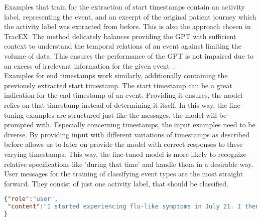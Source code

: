 Examples that train for the extraction of start timestamps contain an activity label, representing the event, and an excerpt of the original patient journey which the activity label was extracted from before. This is also the approach chosen in TracEX. The method delicately balances providing the GPT with sufficient context to understand the temporal relations of an event against limiting the volume of data. This ensures the performance of the GPT is not impaired due to an excess of irrelevant information for the given event~\cite{han_is_2023}.\\
Examples for end timestamps work similarly, additionally containing the previously extracted start timestamp. The start timestamp can be a great indication for the end timestamp of an event. Providing it ensures, the model relies on that timestamp instead of determining it itself.
In this way, the fine-tuning examples are structured just like the messages, the model will be prompted with. Especially concerning timestamps, the input examples need to be diverse. By providing input with different variations of timestamps as described before allows us to later on provide the model with  correct responses to these varying timestamps. This way, the fine-tuned model is more likely to recognize relative specifications like 'during that time' and handle them in a desirable way. \\
User messages for the training of classifying event types are the most straight forward. They consist of just one activity label, that should be classified.
\begin{lstlisting}[language=json, caption={User message for determining an activities start timestamp}, label={lst:user:starttime}]
{"role":"user",
 "content":"I started experiencing flu-like symptoms in July 21. I then got tested positive for Covid19. In October I got infected again. Then on the 4th of November I got my first dosage of the vaccine. I had heavy side effects.\n Activity Label: starting to experience symptoms"
}
\end{lstlisting}

